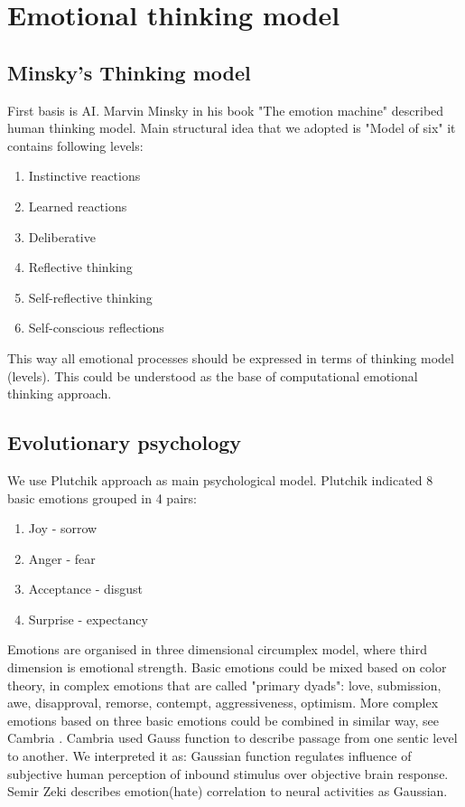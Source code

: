 \section{Emotional thinking model}

\subsection{Minsky's Thinking model}

First basis is  AI. Marvin Minsky in his book "The emotion machine" \cite{emotionmachine} described human thinking model. Main structural idea that we adopted is "Model of six" it contains following levels: 

\begin{enumerate}
\item  Instinctive reactions
\item  Learned reactions
\item  Deliberative
\item  Reflective thinking
\item  Self-reflective thinking
\item  Self-conscious reflections
\end{enumerate}

This way all emotional processes should be expressed in terms of thinking model (levels). This could be understood as the base of computational emotional thinking approach.

\subsection{Evolutionary psychology}

We use Plutchik approach \cite{natureofemotions} as main psychological model. Plutchik indicated 8 basic emotions grouped in 4 pairs:

\begin{enumerate}
\item  Joy - sorrow
\item  Anger - fear
\item  Acceptance - disgust
\item  Surprise - expectancy
\end{enumerate}

Emotions are organised in three dimensional circumplex model, where third dimension is emotional strength. Basic emotions could be mixed based on color theory, in complex emotions that are called "primary dyads": love, submission, awe, disapproval, remorse, contempt, aggressiveness, optimism. More complex emotions based on three basic emotions could be combined in similar way, see Cambria \cite{senticcomputing}. Cambria \cite{hourglass} used Gauss function to describe passage from one sentic level to another. We interpreted it as: Gaussian function regulates influence of subjective human perception of inbound stimulus over objective brain response. Semir Zeki \cite{neuralcorrelatesofhate} describes emotion(hate) correlation to neural activities as Gaussian.

